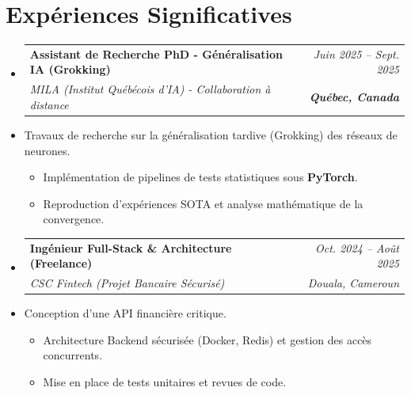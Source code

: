 \documentclass[a4paper,11pt]{article}
\makeatletter
\newcommand{\resumeItem}[1]{\item\small{#1}}
\newcommand{\resumeSubheading}[4]{
  \vspace{-1pt}\item
    \begin{tabular*}{0.97\textwidth}[t]{l@{\extracolsep{\fill}}r}
      \textbf{#1} & \textit{\small #2} \\
      \textit{\small #3} & \textit{\small #4} \\
    \end{tabular*}\vspace{-5pt}
}
\makeatother
\begin{document}
\section{Expériences Significatives}
\begin{itemize}[leftmargin=*, label={-}]

    \resumeSubheading
      {Assistant de Recherche PhD - Généralisation IA (Grokking)}{Juin 2025 -- Sept. 2025}
      {MILA (Institut Québécois d'IA) - Collaboration à distance}{\textbf{Québec, Canada}}
      \resumeItem{Travaux de recherche sur la généralisation tardive (Grokking) des réseaux de neurones.}
      \begin{itemize}[leftmargin=0.4cm, nosep, label=\tiny$\bullet$]
        \item \small{Implémentation de pipelines de tests statistiques sous \textbf{PyTorch}.}
        \item \small{Reproduction d'expériences SOTA et analyse mathématique de la convergence.}
      \end{itemize}
    \vspace{2pt}

    \resumeSubheading
      {Ingénieur Full-Stack \& Architecture (Freelance)}{Oct. 2024 -- Août 2025}
      {CSC Fintech (Projet Bancaire Sécurisé)}{Douala, Cameroun}
      \resumeItem{Conception d'une API financière critique.}
      \begin{itemize}[leftmargin=0.4cm, nosep, label=\tiny$\bullet$]
        \item \small{Architecture Backend sécurisée (Docker, Redis) et gestion des accès concurrents.}
        \item \small{Mise en place de tests unitaires et revues de code.}
      \end{itemize}
    \vspace{2pt}
\end{itemize}

\end{document}
